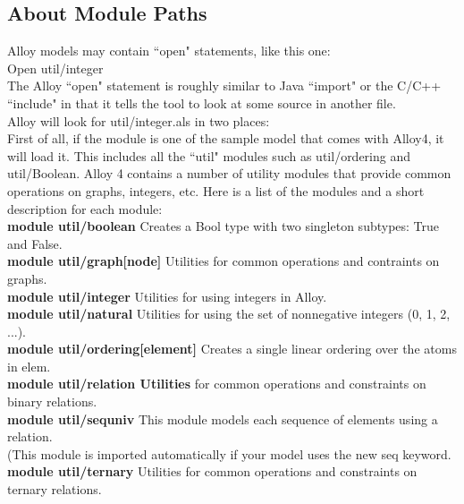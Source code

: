\documentclass[a4paper,12pt]{extarticle}
\begin{document}
\subsection{About Module Paths}
\label{Module Paths}
Alloy models may contain ``open" statements, like this one:\\
Open util/integer\\
The Alloy ``open" statement is roughly similar to Java ``import" or the C/C++ ``include" in that it tells the tool to look at some source in another file.\\
Alloy will look for util/integer.als in two places:\\
First of all, if the module is one of the sample model that comes with Alloy4, it will load it. This includes all the ``util" modules such as util/ordering and util/Boolean.
Alloy 4 contains a number of utility modules that provide common operations on graphs, integers, etc. Here is a list of the modules and a short description for each module: \\
\textbf{module util/boolean} Creates a Bool type with two singleton subtypes: True and False. \\
\textbf{module util/graph[node]} Utilities for common operations and contraints on graphs. \\
\textbf{module util/integer} Utilities for using integers in Alloy. \\
\textbf{module util/natural} Utilities for using the set of nonnegative integers (0, 1, 2, ...). \\
\textbf{module util/ordering[element]} Creates a single linear ordering over the atoms in elem. \\
\textbf{module util/relation Utilities} for common operations and constraints on binary relations. \\
\textbf{module util/sequniv} This module models each sequence of elements using a relation.\\
(This module is imported automatically if your model uses the new seq keyword. \\
\textbf{module util/ternary} Utilities for common operations and constraints on ternary relations.\\
\end{document}
